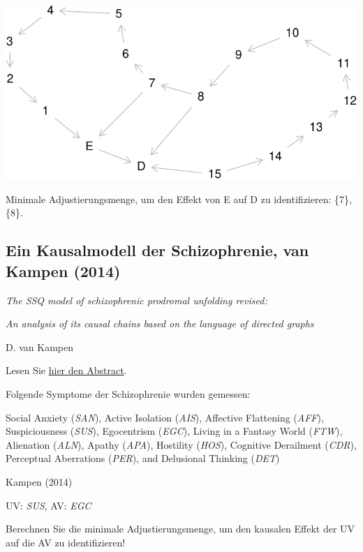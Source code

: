\documentclass[
  a4paper,
  DIV=11]{scrreprt}
\theoremstyle{definition}
\theoremstyle{remark}
\begin{document}
\includegraphics{./abschluss_files/figure-pdf/dag3-1.pdf}

Minimale Adjustierungsmenge, um den Effekt von E auf D zu
identifizieren: \{7\}, \{8\}.

\hypertarget{ein-kausalmodell-der-schizophrenie-van-kampen-2014}{%
\subsection{Ein Kausalmodell der Schizophrenie, van Kampen
(2014)}\label{ein-kausalmodell-der-schizophrenie-van-kampen-2014}}

\emph{The SSQ model of schizophrenic prodromal unfolding revised:}

\emph{An analysis of its causal chains based on the language of directed
graphs}

D. van Kampen

Lesen Sie
\href{https://www.cambridge.org/core/journals/european-psychiatry/article/abs/ssq-model-of-schizophrenic-prodromal-unfolding-revised-an-analysis-of-its-causal-chains-based-on-the-language-of-directed-graphs/F2E7BBFC1B392616DB894AFBFABE7818}{hier
den Abstract}.

Folgende Symptome der Schizophrenie wurden gemessen:

Social Anxiety (\emph{SAN}), Active Isolation (\emph{AIS}), Affective
Flattening (\emph{AFF}), Suspiciousness (\emph{SUS}), Egocentrism
(\emph{EGC}), Living in a Fantasy World (\emph{FTW}), Alienation
(\emph{ALN}), Apathy (\emph{APA}), Hostility (\emph{HOS}), Cognitive
Derailment (\emph{CDR}), Perceptual Aberrations (\emph{PER}), and
Delusional Thinking (\emph{DET})

Kampen (2014)

UV: \emph{SUS}, AV: \emph{EGC}

Berechnen Sie die minimale Adjustierungsmenge, um den kausalen Effekt
der UV auf die AV zu identifizieren!
\end{document}
